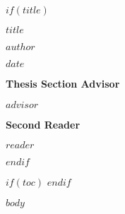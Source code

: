 \documentclass[12pt]{article}
\begin{document}
$if(title)$
\begin{titlepage}
\begin{center}

\vspace*{2cm}
{\LARGE $title$\par}

\vspace{2cm}
{\Large $author$\par}

\vspace{1cm}
{\large $date$\par}

\vfill %

{\footnotesize\textbf{Thesis Section Advisor}}\par
{\normalsize $advisor$}\par

\vspace{0.5cm}
{\footnotesize\textbf{Second Reader}}\par
{\normalsize $reader$}\par

\vspace{2cm}

\end{center}
\end{titlepage}
\newpage
$endif$

$if(toc)$
\tableofcontents
\newpage
$endif$

$body$
\end{document}
